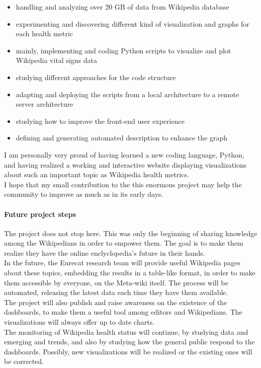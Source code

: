 \begin{itemize}
    \item handling and analyzing over 20 GB of data from Wikipedia database 
    \item experimenting and discovering different kind of visualization and graphs for each health metric
    \item mainly, implementing and coding Python scripts to visualize and plot Wikipedia vital signs data
    \item studying different approaches for the code structure
    \item adapting and deploying the scripts from a local architecture to a remote server architecture
    \item studying how to improve the front-end user experience
    \item defining and generating automated description to enhance the graph 
\end{itemize}

I am personally very proud of having learned a new coding language, Python, and having realized a working and interactive website displaying visualizations about such an important topic as Wikipedia health metrics. \\
I hope that my small contribution to the this enormous project may help the community to improve as much as in its early days.

\paragraph{Future project steps}

The project does not stop here.
This was only the beginning of sharing knowledge among the Wikipedians in order to empower them. The goal is to make them realize they have the online enclyclopedia's future in their hands.\\
In the future, the Eurecat research team will provide useful Wikipedia pages about these topics, embedding the results in a table-like format, in order to make them accessible by everyone, on the Meta-wiki itself. The process will be automated, releasing the latest data each time they have them available.\\
The project will also publish and raise awareness on the existence of the dashboards, to make them a useful tool among editors and Wikipedians. The visualizations will always offer up to date charts.\\
The monitoring of Wikipedia health status will continue, by studying data and emerging and trends, and also by studying how the general public respond to the dashboards. Possibly, new visualizations will be realized or the existing ones will be corrected.
